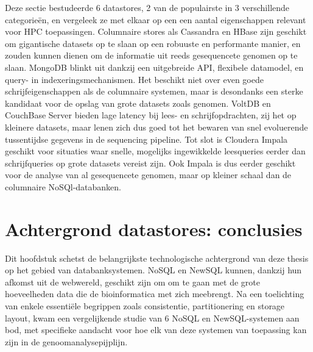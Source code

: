 Deze sectie bestudeerde 6 datastores, 2 van de populairste in 3 verschillende categorie\"en, en vergeleek ze met elkaar op een een aantal eigenschappen relevant voor HPC toepassingen. Columnaire stores als Cassandra en HBase zijn geschikt om gigantische datasets op te slaan op een robuuste en performante manier, en zouden kunnen dienen om de informatie uit reeds gesequencete genomen op te slaan. MongoDB blinkt uit dankzij een uitgebreide API, flexibele datamodel, en query- in indexeringsmechanismen. Het beschikt niet over even goede schrijfeigenschappen als de columnaire systemen, maar is desondanks een sterke kandidaat voor de opslag van grote datasets zoals genomen. VoltDB en CouchBase Server bieden lage latency bij lees- en schrijfopdrachten, zij het op kleinere datasets, maar lenen zich dus goed tot het bewaren van snel evoluerende tussentijdse gegevens in de sequencing pipeline. Tot slot is Cloudera Impala geschikt voor situaties waar snelle, mogelijks ingewikkelde leesqueries eerder dan schrijfqueries op grote datasets vereist zijn. Ook Impala is dus eerder geschikt voor de analyse van al gesequencete genomen, maar op kleiner schaal dan de columnaire NoSQl-databanken.

\section{Achtergrond datastores: conclusies}

Dit hoofdstuk schetst de belangrijkste technologische achtergrond van deze thesis op het gebied van databanksystemen. NoSQL en NewSQL kunnen, dankzij hun afkomst uit de webwereld, geschikt zijn om om te gaan met de grote hoeveelheden data die de bioinformatica met zich meebrengt. Na een toelichting van enkele essenti\"ele begrippen zoals consistentie, partitionering en storage layout, kwam een vergelijkende studie van 6 NoSQL en NewSQL-systemen aan bod, met specifieke aandacht voor hoe elk van deze systemen van toepassing kan zijn in de genoomanalysepijplijn.

